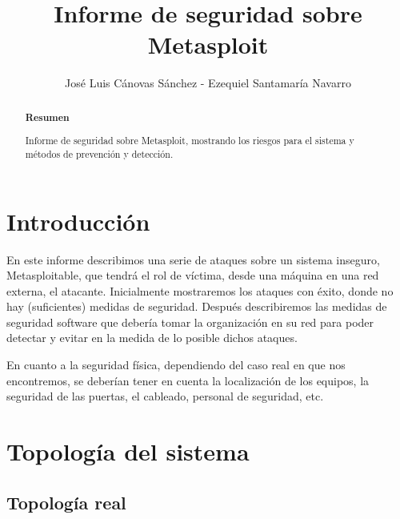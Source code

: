 \documentclass[a4paper,12pt]{scrartcl}
\title{Informe de seguridad sobre Metasploit}
\author{José Luis Cánovas Sánchez - Ezequiel Santamaría Navarro}
\begin{document}

\maketitle

\newpage


\setcounter{page}{1}

\begin{abstract}
\begin{center}
	\textbf{Resumen}
\end{center}

\vspace{10pt}

Informe de seguridad sobre Metasploit, mostrando los riesgos para el sistema y métodos de prevención y detección. 
\end{abstract}

\newpage

\tableofcontents

\newpage

\section{Introducción}


En este informe describimos una serie de ataques sobre un sistema inseguro, Metasploitable, que tendrá el rol de víctima, desde una máquina en una red externa, el atacante. Inicialmente mostraremos los ataques con éxito, donde no hay (suficientes) medidas de seguridad. Después describiremos las medidas de seguridad software que debería tomar la organización en su red para poder detectar y evitar en la medida de lo posible dichos ataques.

En cuanto a la seguridad física, dependiendo del caso real en que nos encontremos, se deberían tener en cuenta la localización de los equipos, la seguridad de las puertas, el cableado, personal de seguridad, etc.

\section{Topología del sistema}


\subsection{Topología real}
\end{document}
